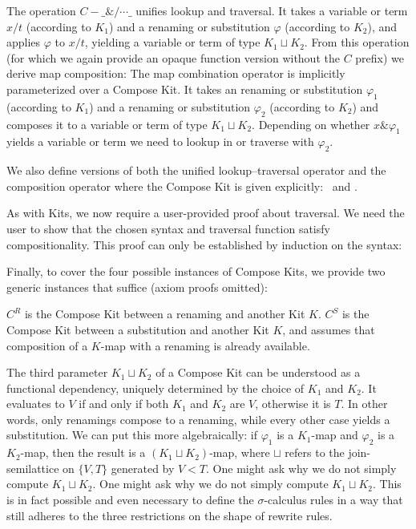 \documentclass[screen,nonacm]{acmart}
\begin{document}
The operation $C-\_\&/⋯\_$ unifies lookup and traversal. It takes a variable or
term $x/t$ (according to $K_1$) and a renaming or substitution $\varphi$
(according to $K_2$), and applies $\varphi$ to $x/t$, yielding a variable or
term of type $K_1 \sqcup K_2$. From this operation (for which we again provide
an opaque function version without the $C$ prefix) we derive map composition:
\ACompDef{} The map combination operator is implicitly parameterized over a
Compose Kit. It takes an renaming or substitution $\varphi_1$ (according to
$K_1$) and a renaming or substitution $\varphi_2$ (according to $K_2$) and
composes it to a variable or term of type $K_1 \sqcup K_2$. Depending on
whether $x \& \varphi_1$ yields a variable or term we need to lookup in or
traverse with $\varphi_2$.

We also define versions of both the unified lookup–traversal operator and the
composition operator where the Compose Kit is given explicitly: \ACompExp \ and
\ALoAExp.

As with Kits, we now require a user-provided proof about traversal. We need the
user to show that the chosen syntax and traversal function satisfy
compositionality. This proof can only be established by induction on the
syntax: \ACompositionality

Finally, to cover the four possible instances of Compose Kits, we provide two
generic instances that suffice (axiom proofs omitted):

\begin{minipage}{0.38\linewidth}
      \raggedright{}
      \AInstanceCRen{}
\end{minipage}
\begin{minipage}{0.58\linewidth}
      \raggedright{}
      \AInstanceCSub{}
\end{minipage}

$C^R$ is the Compose Kit between a renaming and another Kit $K$.
$C^S$ is the Compose Kit between a substitution and another Kit $K$, and assumes that composition of a $K$-map with a renaming is already available.

The third parameter $K_1 \sqcup K_2$ of a Compose Kit can be understood as a
functional dependency, uniquely determined by the choice of $K_1$ and $K_2$. It
evaluates to $V$ if and only if both $K_1$ and $K_2$ are $V$, otherwise it is
$T$. In other words, only renamings compose to a renaming, while every other
case yields a substitution. We can put this more algebraically: if $\varphi_1$
is a $K_1$-map and $\varphi_2$ is a $K_2$-map, then the result is a $(K_1
      \sqcup K_2)$-map, where $\sqcup$ refers to the join-semilattice on $\{V, T\}$
generated by $V < T$. One might ask why we do not simply compute $K_1 \sqcup
      K_2$. One might ask why we do not simply compute $K_1 \sqcup K_2$. This is in
fact possible and even necessary to define the $\sigma$-calculus rules in a way
that still adheres to the three restrictions on the shape of rewrite rules.
\end{document}
